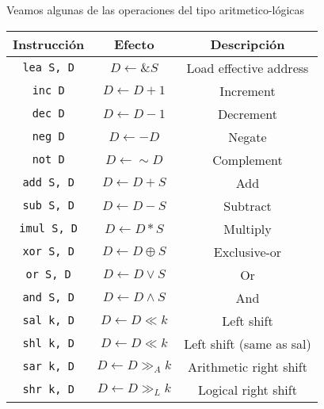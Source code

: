 Veamos algunas de las operaciones del tipo aritmetico-lógicas
\begin{center}
    \begin{tabular}{|c|c|c|}
    \hline
    \textbf{Instrucción} & \textbf{Efecto}                       & \textbf{Descripción}     \\ \hline
    \texttt{lea S, D}         & $D \leftarrow \&S$                   & Load effective address   \\ \hline
    \texttt{inc D}            & $D \leftarrow D + 1$                 & Increment                \\ \hline
    \texttt{dec D}            & $D \leftarrow D - 1$                 & Decrement                \\ \hline
    \texttt{neg D}            & $D \leftarrow -D$                    & Negate                   \\ \hline
    \texttt{not D}            & $D \leftarrow \sim D$                & Complement               \\ \hline
    \texttt{add S, D}         & $D \leftarrow D + S$                 & Add                      \\ \hline
    \texttt{sub S, D}         & $D \leftarrow D - S$                 & Subtract                 \\ \hline
    \texttt{imul S, D}        & $D \leftarrow D * S$                 & Multiply                 \\ \hline
    \texttt{xor S, D}         & $D \leftarrow D \oplus S$            & Exclusive-or             \\ \hline
    \texttt{or S, D}          & $D \leftarrow D \vee S$              & Or                       \\ \hline
    \texttt{and S, D}         & $D \leftarrow D \wedge S$            & And                      \\ \hline
    \texttt{sal k, D}         & $D \leftarrow D \ll k$               & Left shift               \\ \hline
    \texttt{shl k, D}         & $D \leftarrow D \ll k$               & Left shift (same as sal) \\ \hline
    \texttt{sar k, D}         & $D \leftarrow D \gg_A k$             & Arithmetic right shift   \\ \hline
    \texttt{shr k, D}         & $D \leftarrow D \gg_L k$             & Logical right shift      \\ \hline
    \end{tabular}
\end{center}


